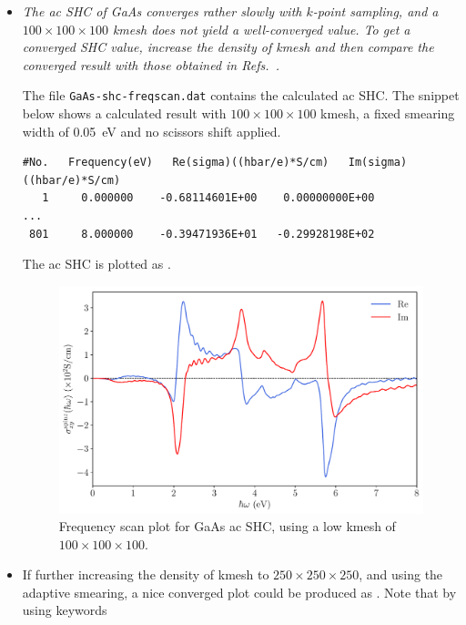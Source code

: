 \begin{itemize}
	\item {\it The ac SHC of GaAs converges rather slowly with $k$-point sampling, and a $100 \times 100 \times 100$ kmesh does not yield a well-converged value.
	To get a converged SHC value, increase the density of kmesh and then compare the converged result with those obtained in Refs.~.}

	The file {\tt GaAs-shc-freqscan.dat} contains the calculated ac SHC. 
	The snippet below shows a calculated result with 
	$100\times100\times100$ kmesh, 
	a fixed smearing width of 0.05~eV and no scissors shift applied.

\begin{tcolorbox}[title=$100\times100\times100$ kmesh,sharp corners,boxrule=0.5pt]
{\small
\begin{verbatim}
#No.   Frequency(eV)   Re(sigma)((hbar/e)*S/cm)   Im(sigma)((hbar/e)*S/cm)
   1     0.000000    -0.68114601E+00    0.00000000E+00
...
 801     8.000000    -0.39471936E+01   -0.29928198E+02
\end{verbatim}
}
\end{tcolorbox}

The ac SHC is plotted as .
\begin{figure}[htb!]
\centering
\includegraphics[width=.8\columnwidth]{figure/example30/gaas_freqscan_100kpt.pdf}
\caption{Frequency scan plot for GaAs ac SHC, using 
	a low kmesh of $100\times100\times100$.}
\label{fig30.1}
\end{figure}

\item If further increasing the density of kmesh to 
$250\times250\times250$, and using the adaptive smearing, 
a nice converged plot could be produced as . 
Note that by using keywords 
\end{itemize}
